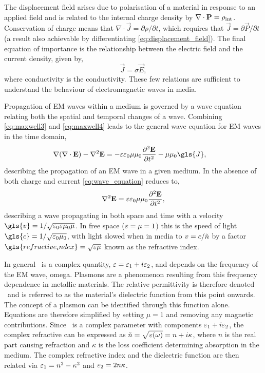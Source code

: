 \documentclass{article}
\begin{document}
The displacement field arises due to polarisation of a material in response to an applied field and is related to the internal charge density by $\nabla\cdot\mathbf{P}=\rho_{\mathrm{int}}$. Conservation of charge means that $\nabla\cdot\vec{J}=\partial\rho/\partial t$, which requires that $\vec{J}=\partial\vec{P}/\partial t$ (a result also achievable by differentiating \eqref{eq:displacement_field}). The final equation of importance is the relationship between the electric field and the current density, given by,
\begin{equation}
	\vec{J} = \sigma\vec{E},
	\label{eq:current_density}
\end{equation}
where \gls{conductivity} is the conductivity. These few relations are sufficient to understand the behaviour of electromagnetic waves in media.

Propagation of EM waves within a medium is governed by a wave equation relating both the spatial and temporal changes of a wave. Combining \eqref{eq:maxwell3} and \eqref{eq:maxwell4} leads to the general wave equation for EM waves in the time domain,
\begin{align}
	\nabla(\nabla\cdot\vec{E}) - \nabla^2\vec{E} &= -\eps\epsfs\mu\mu_0\frac{\partial^2\vec{E}}{\partial t^2} - \mu\mu_0\gls{J},%
	\label{eq:wave_equation}
\end{align}
describing the propagation of an EM wave in a given medium.
In the absence of both charge and current \eqref{eq:wave_equation} reduces to,
\begin{equation}
	\nabla^2\mathbf{E} = \varepsilon\varepsilon_0\mu\mu_0\frac{\partial^2\mathbf{E}}{\partial t^2},
\end{equation}
describing a wave propagating in both space and time with a velocity $\gls{v}=1/\sqrt{\epsfs\eps\mu_0\mu}$. In free space ($\varepsilon=\mu=1$) this is the speed of light $\gls{c}=1/\sqrt{\epsfs\mu_0}$, with light slowed when in media to $v=c/\tilde{n}$ by a factor $\gls{refractive_index}=\sqrt{\eps\mu}$ known as the refractive index.

In general \eps\ is a complex quantity, $\varepsilon=\varepsilon_1+i\varepsilon_2$, and depends on the frequency of the EM wave, \gls{omega}. Plasmons are a phenomenon resulting from this frequency dependence in metallic materials. The relative permittivity is therefore denoted \dielectric\ and is referred to as the material's dielectric function from this point onwards. The concept of a plasmon can be identified through this function alone. Equations are therefore simplified by setting $\mu=1$ and removing any magnetic contributions.
Since \dielectric\ is a complex parameter with components $\varepsilon_1+i\varepsilon_2$, the complex refractive can be expressed as $\tilde{n}=\sqrt{\varepsilon(\omega)}=n+i\kappa$, where $n$ is the real part causing refraction and $\kappa$ is the loss coefficient determining absorption in the medium. The complex refractive index and the dielectric function are then related via $\varepsilon_1=n^2-\kappa^2$ and $\varepsilon_2 = 2n\kappa$.
\end{document}
